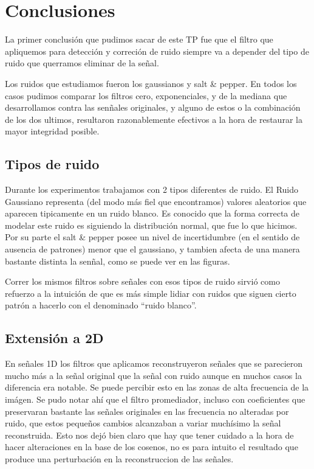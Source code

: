 \section{Conclusiones}

La primer conclusi\'on que pudimos sacar de este TP fue que el filtro que apliquemos para detecci\'on y correci\'on
de ruido siempre va a depender del tipo de ruido que querramos eliminar de la se\~nal.

Los ruidos que estudiamos fueron los gaussianos  y salt & pepper. En todos los casos pudimos comparar los filtros
cero, exponenciales, y de la mediana que desarrollamos contra las sen\~nales originales, y alguno de estos o
la combinaci\'on de los dos ultimos, resultaron razonablemente efectivos a la hora de restaurar la mayor integridad posible.

\subsection{Tipos de ruido}

Durante los experimentos trabajamos con 2 tipos diferentes de ruido. 
El  Ruido Gaussiano representa (del modo m\'as fiel que encontramos) valores aleatorios  que aparecen tipicamente en
un ruido blanco. Es conocido que la forma correcta de modelar este ruido es siguiendo la distribuci\'on normal,
que fue lo que hicimos.
Por su parte el salt & pepper posee un nivel de incertidumbre (en el sentido de ausencia de patrones)
menor que el gaussiano, y tambien afecta de una manera bastante distinta la sen\~nal, como se puede ver en las
figuras.

Correr los mismos filtros sobre se\~nales con esos tipos de ruido sirvi\'o como
refuerzo a la intuici\'on de que es m\'as simple lidiar con ruidos que siguen
cierto patr\'on a hacerlo con el denominado ``ruido blanco''.

\subsection{Extensi\'on a 2D}

En se\~nales 1D los filtros que aplicamos reconstruyeron se\~nales que se parecieron mucho m\'as a la se\~nal
original que la se\~nal con ruido aunque en muchos casos la diferencia era notable. Se puede percibir esto en las zonas
de alta frecuencia de la im\'agen. 
Se pudo notar ah\'i que el filtro promediador, incluso con coeficientes que preservaran
bastante las se\~nales originales en las frecuencia no alteradas por ruido, que estos peque\~nos cambios alcanzaban a
variar much\'isimo la se\~nal reconstruida. Esto nos dej\'o bien claro que hay que tener cuidado a la hora de hacer alteraciones
en la base de los cosenos, no es para intuito el resultado que produce una perturbaci\'on en la reconstruccion de las se\~nales.

